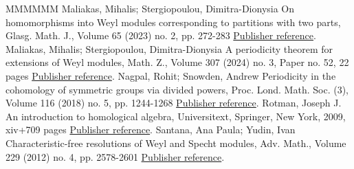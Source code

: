 \documentclass[11pt]{article}
\theoremstyle{definition}
\numberwithin{equation}{section}
\numberwithin{equation}{section}
\begin{document}
\begin{thebibliography}{MMMMMM}
 Maliakas, Mihalis; Stergiopoulou, Dimitra-Dionysia On homomorphisms into Weyl modules corresponding to partitions with two parts, Glasg. Math. J., Volume 65 (2023) no. 2, pp. 272-283 \href{https://alco.centre-mersenne.org/articles/10.5802/alco.397/#MS3}{Publisher reference}.
 Maliakas, Mihalis; Stergiopoulou, Dimitra-Dionysia A periodicity theorem for extensions of Weyl modules, Math. Z., Volume 307 (2024) no. 3, Paper no. 52, 22 pages \href{https://alco.centre-mersenne.org/articles/10.5802/alco.397/#MS4}{Publisher reference}.
 Nagpal, Rohit; Snowden, Andrew Periodicity in the cohomology of symmetric groups via divided powers, Proc. Lond. Math. Soc. (3), Volume 116 (2018) no. 5, pp. 1244-1268 \href{https://alco.centre-mersenne.org/articles/10.5802/alco.397/#NS}{Publisher reference}.
 Rotman, Joseph J. An introduction to homological algebra, Universitext, Springer, New York, 2009, xiv+709 pages \href{https://alco.centre-mersenne.org/articles/10.5802/alco.397/#Ro}{Publisher reference}.
 Santana, Ana Paula; Yudin, Ivan Characteristic-free resolutions of Weyl and Specht modules, Adv. Math., Volume 229 (2012) no. 4, pp. 2578-2601 \href{https://alco.centre-mersenne.org/articles/10.5802/alco.397/#SY}{Publisher reference}.
\end{thebibliography}
\end{document}
